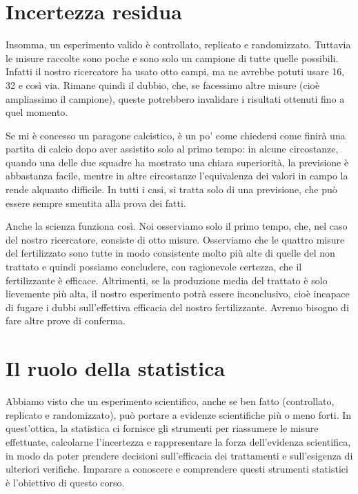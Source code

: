 \documentclass[a4paper,12pt,oneside]{book}
\begin{document}
\section{Incertezza residua}\label{incertezza-residua}

Insomma, un esperimento valido è controllato, replicato e randomizzato.
Tuttavia le misure raccolte sono poche e sono solo un campione di tutte
quelle possibili. Infatti il nostro ricercatore ha usato otto campi, ma
ne avrebbe potuti usare 16, 32 e così via. Rimane quindi il dubbio, che,
se facessimo altre misure (cioè ampliassimo il campione), queste
potrebbero invalidare i risultati ottenuti fino a quel momento.

Se mi è concesso un paragone calcistico, è un po' come chiedersi come
finirà una partita di calcio dopo aver assistito solo al primo tempo: in
alcune circostanze, quando una delle due squadre ha mostrato una chiara
superiorità, la previsione è abbastanza facile, mentre in altre
circostanze l'equivalenza dei valori in campo la rende alquanto
difficile. In tutti i casi, si tratta solo di una previsione, che può
essere sempre smentita alla prova dei fatti.

Anche la scienza funziona così. Noi osserviamo solo il primo tempo, che,
nel caso del nostro ricercatore, consiste di otto misure. Osserviamo che
le quattro misure del fertilizzato sono tutte in modo consistente molto
più alte di quelle del non trattato e quindi possiamo concludere, con
ragionevole certezza, che il fertilizzante è efficace. Altrimenti, se la
produzione media del trattato è solo lievemente più alta, il nostro
esperimento potrà essere inconclusivo, cioè incapace di fugare i dubbi
sull'effettiva efficacia del nostro fertilizzante. Avremo bisogno di
fare altre prove di conferma.

\section{Il ruolo della statistica}\label{il-ruolo-della-statistica}

Abbiamo visto che un esperimento scientifico, anche se ben fatto
(controllato, replicato e randomizzato), può portare a evidenze
scientifiche più o meno forti. In quest'ottica, la statistica ci
fornisce gli strumenti per riassumere le misure effettuate, calcolarne
l'incertezza e rappresentare la forza dell'evidenza scientifica, in modo
da poter prendere decisioni sull'efficacia dei trattamenti e
sull'esigenza di ulteriori verifiche. Imparare a conoscere e comprendere
questi strumenti statistici è l'obiettivo di questo corso.
\end{document}
